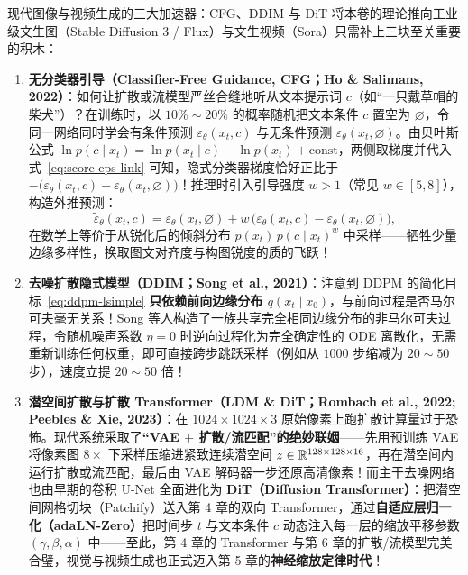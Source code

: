 \begin{extBox}{现代图像与视频生成的三大加速器：CFG、DDIM 与 DiT}
将本卷的理论推向工业级文生图（Stable Diffusion 3 / Flux）与文生视频（Sora）只需补上三块至关重要的积木：
\begin{enumerate}
  \item \textbf{无分类器引导（Classifier-Free Guidance, CFG；Ho \& Salimans, 2022）}：如何让扩散或流模型严丝合缝地听从文本提示词 $c$（如“一只戴草帽的柴犬”）？在训练时，以 $10\%\sim 20\%$ 的概率随机把文本条件 $c$ 置空为 $\varnothing$，令同一网络同时学会有条件预测 $\varepsilon_\theta(x_t, c)$ 与无条件预测 $\varepsilon_\theta(x_t, \varnothing)$。由贝叶斯公式 $\ln p(c \mid x_t) = \ln p(x_t \mid c) - \ln p(x_t) + \text{const}$，两侧取梯度并代入式~\eqref{eq:score-eps-link} 可知，隐式分类器梯度恰好正比于 $-\big(\varepsilon_\theta(x_t, c) - \varepsilon_\theta(x_t, \varnothing)\big)$！推理时引入引导强度 $w > 1$（常见 $w \in [5, 8]$），构造外推预测：
  \[
    \tilde{\varepsilon}_\theta(x_t, c)
    = \varepsilon_\theta(x_t, \varnothing) + w\,\big(\varepsilon_\theta(x_t, c) - \varepsilon_\theta(x_t, \varnothing)\big),
  \]
  在数学上等价于从锐化后的倾斜分布 $p(x_t)\,p(c \mid x_t)^w$ 中采样——牺牲少量边缘多样性，换取图文对齐度与构图锐度的质的飞跃！
  \item \textbf{去噪扩散隐式模型（DDIM；Song et al., 2021）}：注意到 DDPM 的简化目标~\eqref{eq:ddpm-lsimple} \textbf{只依赖前向边缘分布 $q(x_t \mid x_0)$}，与前向过程是否马尔可夫毫无关系！Song 等人构造了一族共享完全相同边缘分布的非马尔可夫过程，令随机噪声系数 $\eta = 0$ 时逆向过程化为完全确定性的 ODE 离散化，无需重新训练任何权重，即可直接跨步跳跃采样（例如从 $1000$ 步缩减为 $20\sim 50$ 步），速度立提 $20\sim 50$ 倍！
  \item \textbf{潜空间扩散与扩散 Transformer（LDM \& DiT；Rombach et al., 2022; Peebles \& Xie, 2023）}：在 $1024 \times 1024 \times 3$ 原始像素上跑扩散计算量过于恐怖。现代系统采取了\textbf{“VAE $+$ 扩散/流匹配”的绝妙联姻}——先用预训练 VAE 将像素图 $8\times$ 下采样压缩进紧致连续潜空间 $z \in \mathbb{R}^{128 \times 128 \times 16}$，再在潜空间内运行扩散或流匹配，最后由 VAE 解码器一步还原高清像素！而主干去噪网络也由早期的卷积 U-Net 全面进化为 \textbf{DiT（Diffusion Transformer）}：把潜空间网格切块（Patchify）送入第 4 章的双向 Transformer，通过\textbf{自适应层归一化（adaLN-Zero）}把时间步 $t$ 与文本条件 $c$ 动态注入每一层的缩放平移参数 $(\gamma, \beta, \alpha)$ 中——至此，第 4 章的 Transformer 与第 6 章的扩散/流模型完美合璧，视觉与视频生成也正式迈入第 5 章的\textbf{神经缩放定律时代}！
\end{enumerate}
\end{extBox}

